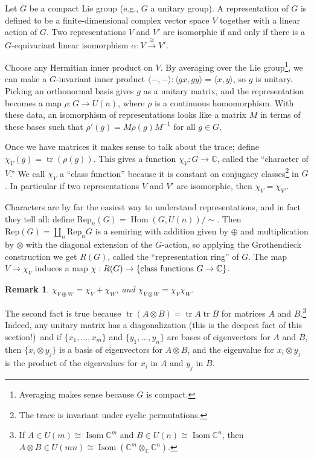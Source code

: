\documentclass{article}
\newcommand{\C}{\mathbb{C}}
\DeclareMathOperator{\tr}{tr}
\DeclareMathOperator{\Hom}{Hom}
\newtheorem{rem}[thm]{Remark}
\begin{document}
Let $G$ be a compact Lie group (e.g., $G$ a unitary group).  A representation of $G$ is defined to be a finite-dimensional complex vector space $V$ together with a linear action of $G$.  Two representations $V$ and $V'$ are isomorphic if and only if there is a $G$-equivariant linear isomorphism $\alpha: V \stackrel{\cong}{\to} V'$.

Choose any Hermitian inner product on $V$.  By averaging over the Lie group\footnote{Averaging makes sense because $G$ is compact.}, we can make a $G$-invariant inner product $\langle - , - \rangle: \langle gx, gy \rangle = \langle x, y \rangle$, so $g$ is unitary.  Picking an orthonormal basis gives $g$ as a unitary matrix, and the representation becomes a map $\rho: G \to U(n)$, where $\rho$ is a continuous homomorphism.  With these data, an isomorphism of representations looks like a matrix $M$ in terms of these bases such that $\rho'(g) = M \rho(g) M^{-1}$ for all $g \in G$.

Once we have matrices it makes sense to talk about the trace; define $\chi_V(g) = \tr(\rho(g))$.  This gives a function $\chi_V: G \to \C$, called the ``character of $V$.''  We call $\chi_V$ a ``class function'' because it is constant on conjugacy classes\footnote{The trace is invariant under cyclic permutations.} in $G$.  In particular if two representations $V$ and $V'$ are isomorphic, then $\chi_V = \chi_{V'}$.

Characters are by far the easiest way to understand representations, and in fact they tell all: define $\mathrm{Rep}_n(G) = \Hom(G, U(n)) / \sim$.  Then $\mathrm{Rep}(G) = \coprod_n \mathrm{Rep}_n G$ is a semiring with addition given by $\oplus$ and multiplication by $\otimes$ with the diagonal extension of the $G$-action, so applying the Grothendieck construction we get $R(G)$, called the ``representation ring'' of $G$.  The map $V \to \chi_V$ induces a map $\chi: R(G) \to \{\hbox{class functions $G \to \C$}\}$.

\begin{rem}
$\chi_{V \oplus W} = \chi_V + \chi_W$, and $\chi_{V \otimes W} = \chi_V \chi_W$.
\end{rem}
The second fact is true because $\tr(A \otimes B) = \tr A \tr B$ for matrices $A$ and $B$.\footnote{If $A \in U(m) \cong \operatorname{Isom} \C^m$ and $B \in U(n) \cong \operatorname{Isom} \C^n$, then $A \otimes B \in U(mn) \cong \operatorname{Isom} (\C^m \otimes_\C \C^n)$.}  Indeed, any unitary matrix has a diagonalization (this is the deepest fact of this section!)\ and if $\{x_1, \ldots, x_m\}$ and $\{y_1, \ldots, y_n\}$ are bases of eigenvectors for $A$ and $B$, then $\{x_i \otimes y_j\}$ is a basis of eigenvectors for $A \otimes B$, and the eigenvalue for $x_i \otimes y_j$ is the product of the eigenvalues for $x_i$ in $A$ and $y_j$ in $B$.
\end{document}
